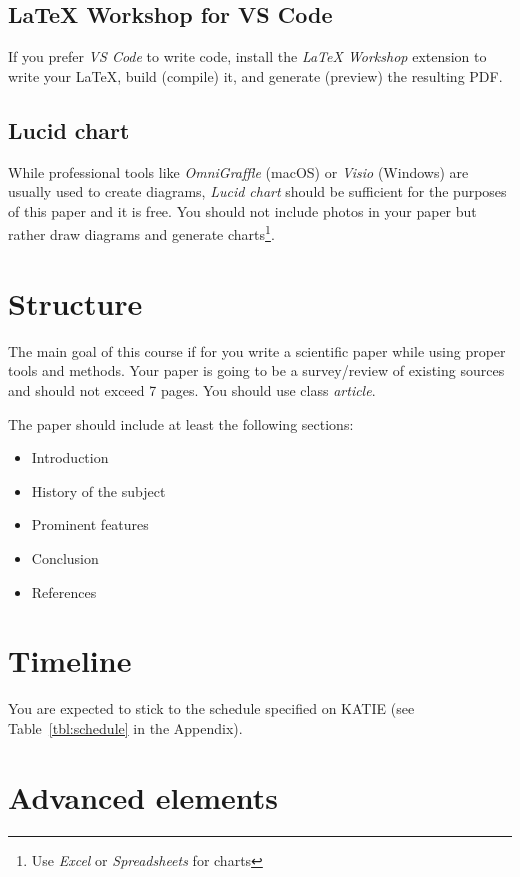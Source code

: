 \documentclass[nonacm]{acmart}
\begin{document}
\subsection{LaTeX Workshop for VS Code}

If you prefer \emph{VS Code} to write code, install the \emph{LaTeX Workshop}
extension to write your \LaTeX, build (compile) it, and generate (preview) the
resulting PDF.

\subsection{Lucid chart}

While professional tools like \emph{OmniGraffle} (macOS) or \emph{Visio}
(Windows) are usually used to create diagrams, \emph{Lucid chart} should be
sufficient for the purposes of this paper and it is free. You should not
include photos in your paper but rather draw diagrams and generate
charts\footnote{Use \emph{Excel} or \emph{Spreadsheets} for charts}.

\enlargethispage{2\baselineskip}

\section{Structure}

The main goal of this course if for you write a scientific paper while using
proper tools and methods. Your paper is going to be a survey/review of existing
sources and should not exceed 7 pages. You should use class \emph{article}.

The paper should include at least the following sections:

\begin{itemize}
    \item Introduction
    \item History of the subject
    \item Prominent features
    \item Conclusion
    \item References
\end{itemize}

\section{Timeline}

You are expected to stick to the schedule specified on KATIE (see
Table~\ref{tbl:schedule} in the Appendix).

\section{Advanced elements}
\end{document}

